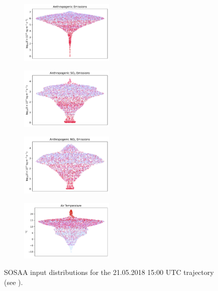 \begin{figure}[H]
    \begin{subfigure}
        \centering
        \includegraphics[width=0.49\textwidth,valign=t]{sosaa-data/figures/trajectories/trajectory-21.05.2018:15.00-anthropogenic.pdf}
    \end{subfigure}
    \begin{subfigure}
        \centering
        \includegraphics[width=0.49\textwidth,valign=t]{sosaa-data/figures/trajectories/trajectory-21.05.2018:15.00-so2.pdf}
    \end{subfigure}

    \begin{subfigure}
        \centering
        \includegraphics[width=0.49\textwidth,valign=t]{sosaa-data/figures/trajectories/trajectory-21.05.2018:15.00-nox.pdf}
    \end{subfigure}
    \begin{subfigure}
        \centering
        \includegraphics[width=0.49\textwidth,valign=t]{sosaa-data/figures/trajectories/trajectory-21.05.2018:15.00-temperature.pdf}
    \end{subfigure}

    \caption[Inputs for the 21.05.2018 15:00 UTC Trajectory]{SOSAA input distributions for the 21.05.2018 15:00 UTC trajectory (see ).}
    \label{fig:trajectory-inputs-21-05}
\end{figure}

